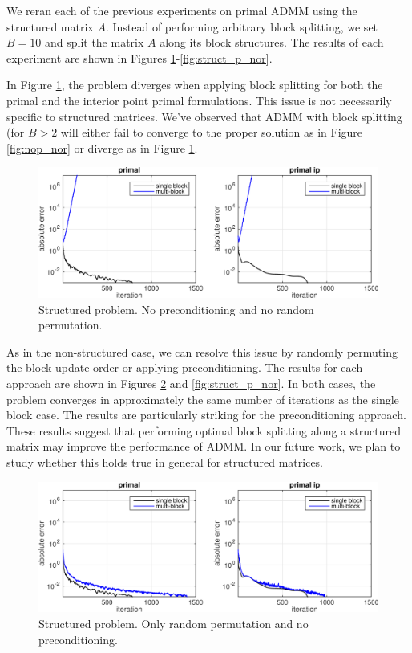 \documentclass{article}
\begin{document}
We reran each of the previous experiments on primal ADMM using the structured matrix $A$. Instead of performing arbitrary block splitting, we set $B=10$ and split the matrix $A$ along its block structures. The results of each experiment are shown in Figures \ref{fig:struct_nop_nor}-\ref{fig:struct_p_nor}.

In Figure \ref{fig:struct_nop_nor}, the problem diverges when applying block splitting for both the primal and the interior point primal formulations. This issue is not necessarily specific to structured matrices. We've observed that ADMM with block splitting (for $B>2$ will either fail to converge to the proper solution as in Figure \ref{fig:nop_nor} or diverge as in Figure \ref{fig:struct_nop_nor}. 

\begin{figure}[h]
	\includegraphics[width=\textwidth]{../figures/struct_noprecond_norndperm.png}
	\caption{Structured problem. No preconditioning and no random permutation.}
	\label{fig:struct_nop_nor}
\end{figure}

As in the non-structured case, we can resolve this issue by randomly permuting the block update order or applying preconditioning. The results for each approach are shown in Figures \ref{fig:struct_nop_r} and \ref{fig:struct_p_nor}. In both cases, the problem converges in approximately the same number of iterations as the single block case. The results are particularly striking for the preconditioning approach. These results suggest that performing optimal block splitting along a structured matrix may improve the performance of ADMM. In our future work, we plan to study whether this holds true in general for structured matrices.

\begin{figure}[h]
	\includegraphics[width=\textwidth]{../figures/struct_noprecond_rndperm.png}
	\caption{Structured problem. Only random permutation and no preconditioning.}
	\label{fig:struct_nop_r}
\end{figure}
\end{document}
